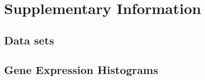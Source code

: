 \chapter*{Supplementary Information}

\section*{Data sets}

% 

\section*{Gene Expression Histograms}

